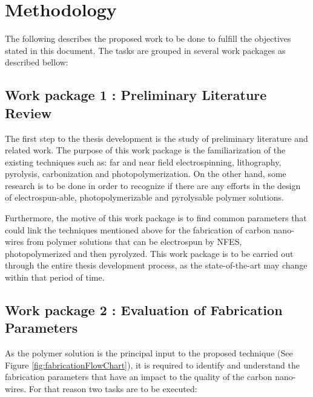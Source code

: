 
\chapter{Methodology} %

\label{Chapter:Methodology}


The following describes the proposed work to be done to fulfill the objectives stated in this document. The tasks are grouped in several work packages as described bellow:


\section{Work package 1 : Preliminary Literature Review}
The first step to the thesis development is the study of preliminary literature and related work. The purpose of this work package is the familiarization of the existing techniques such as: far and near field electrospinning, lithography, pyrolysis, carbonization and photopolymerization. On the other hand, some research is to be done in order to recognize if there are any efforts in the design of electrospun-able, photopolymerizable and pyrolysable polymer solutions.

Furthermore, the motive of this work package is to find common parameters that could link the techniques mentioned above for the fabrication of carbon nano-wires from polymer solutions that can be electrospun by NFES, photopolymerized and then pyrolyzed. This work package is to be carried out through the entire thesis development process, as the state-of-the-art may change within that period of time.

\section{Work package 2 : Evaluation of Fabrication Parameters}
As the polymer solution is the principal input to the proposed technique (See Figure \ref{fig:fabricationFlowChart}), it is required to identify and understand the fabrication parameters that have an impact to the quality of the carbon nano-wires. For that reason two tasks are to be executed:

